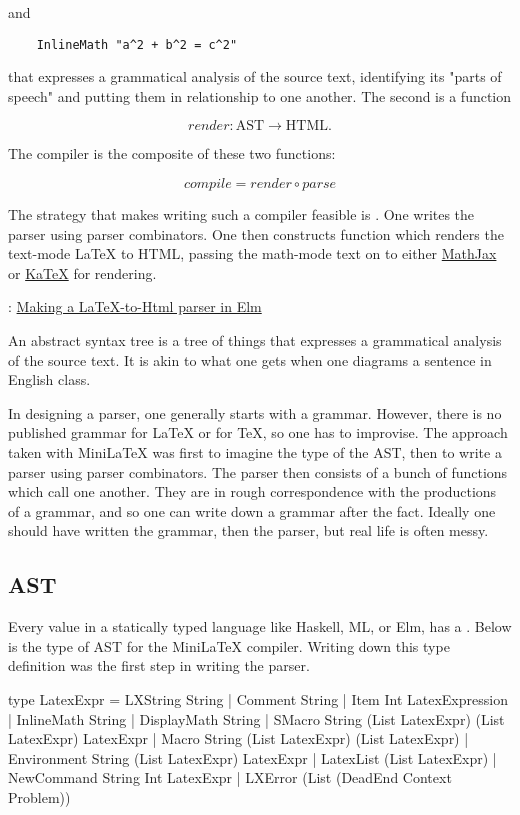 and

\begin{verbatim}
    InlineMath "a^2 + b^2 = c^2"
\end{verbatim}

 that expresses a grammatical analysis of the source text, identifying its "parts of speech" and putting them in relationship to one another.
The second is a function

$$
render: \text{AST} \to \text{HTML}.
$$

The compiler is the composite of these two functions:

$$
compile   = render \circ parse
$$

The strategy that makes writing such a compiler feasible is .  One writes the parser using parser combinators.  One then constructs function which renders the text-mode LaTeX to HTML, passing the math-mode text on to either \href{https://mathjax.org}{MathJax} or \href{https://katex.org}{KaTeX} for rendering. 

: \href{https://www.youtube.com/watch?v=dmDA7iziSgs&t=15s}{Making a LaTeX-to-Html parser in Elm}

An abstract syntax tree is a tree of things that expresses a grammatical analysis of the source text. It is akin to what one gets when one diagrams a sentence in English class.




In designing a parser, one generally starts with a grammar.  However, there is no published grammar for LaTeX or for TeX, so one has to improvise.  The approach taken with MiniLaTeX was first to imagine the type of the AST, then to write a parser using parser combinators.  The parser then consists of a bunch of functions which call one another.  They are in rough correspondence with the productions of a grammar, and so one can write down a grammar after the fact. Ideally one should have written the grammar, then the parser, but real life is often messy.

\subsection{AST}

Every value in a statically typed language like Haskell, ML, or Elm, has a .  Below is the type of AST for the MiniLaTeX compiler.  Writing down this type definition was the first step in writing the parser.

\begin{listing}
type LatexExpr
    = LXString String
    | Comment String
    | Item Int LatexExpression
    | InlineMath String
    | DisplayMath String
    | SMacro String (List LatexExpr) (List LatexExpr) LatexExpr
    | Macro String (List LatexExpr) (List LatexExpr)
    | Environment String (List LatexExpr) LatexExpr
    | LatexList (List LatexExpr)
    | NewCommand String Int LatexExpr
    | LXError (List (DeadEnd Context Problem))
\end{listing}

